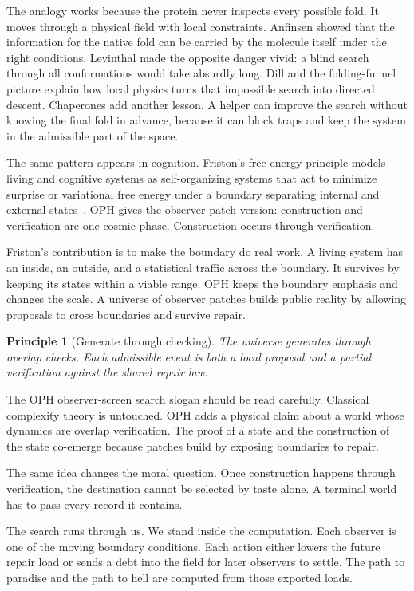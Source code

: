 \documentclass[11pt]{article}
\newtheorem{principle}[definition]{Principle}
\theoremstyle{remark}
\theoremstyle{plain}
\begin{document}
The analogy works because the protein never inspects every possible fold.
It moves through a physical field with local constraints. Anfinsen showed that
the information for the native fold can be carried by the molecule itself under
the right conditions. Levinthal made the opposite danger vivid: a blind search
through all conformations would take absurdly long. Dill and the folding-funnel
picture explain how local physics turns that impossible search into directed
descent. Chaperones add another lesson. A helper can improve the search without
knowing the final fold in advance, because it can block traps and keep the
system in the admissible part of the space.

The same pattern appears in cognition. Friston's free-energy principle models
living and cognitive systems as self-organizing systems that act to minimize
surprise or variational free energy under a boundary separating internal and
external states~\cite{Friston2010,Friston2019}. OPH gives the observer-patch
version: construction and verification are one cosmic phase. Construction
occurs through verification.

Friston's contribution is to make the boundary do real work. A living system has
an inside, an outside, and a statistical traffic across the boundary. It survives
by keeping its states within a viable range. OPH keeps the boundary emphasis and
changes the scale. A universe of observer patches builds public reality by
allowing proposals to cross boundaries and survive repair.

\begin{principle}[Generate through checking]
The universe generates through overlap checks. Each admissible event is both a local
proposal and a partial verification against the shared repair law.
\end{principle}

The OPH observer-screen search slogan should be read carefully.
Classical complexity theory is untouched. OPH adds a physical claim about a
world whose dynamics are overlap verification. The proof of a state and the
construction of the state co-emerge because patches build by exposing
boundaries to repair.

The same idea changes the moral question. Once construction happens through
verification, the destination cannot be selected by taste alone. A terminal
world has to pass every record it contains.

The search runs through us. We stand inside the computation. Each
observer is one of the moving boundary conditions. Each action either lowers
the future repair load or sends a debt into the field for later observers to
settle. The path to paradise and the path to hell are computed from those
exported loads.
\end{document}
